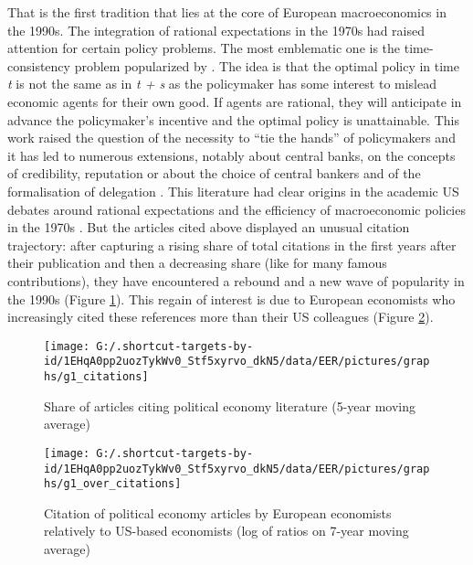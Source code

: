 \documentclass[]{elsarticle} %
\begin{document}
That is the first tradition that lies at the core of European
macroeconomics in the 1990s. The integration of rational expectations in
the 1970s had raised attention for certain policy problems. The most
emblematic one is the time-consistency problem popularized by
\citet{kydland1977}. The idea is that the optimal policy in time
\emph{t} is not the same as in \emph{t + s} as the policymaker has some
interest to mislead economic agents for their own good. If agents are
rational, they will anticipate in advance the policymaker's incentive
and the optimal policy is unattainable. This work raised the question of
the necessity to ``tie the hands'' of policymakers and it has led to
numerous extensions, notably about central banks, on the concepts of
credibility, reputation \citep{barro1983, barro1983c} or about the
choice of central bankers and of the formalisation of delegation
\citep{rogoff1985b}. This literature had clear origins in the academic
US debates around rational expectations and the efficiency of
macroeconomic policies in the 1970s \citep[80-86]{hoover1988}. But the
articles cited above displayed an unusual citation trajectory: after
capturing a rising share of total citations in the first years after
their publication and then a decreasing share (like for many famous
contributions), they have encountered a rebound and a new wave of
popularity in the 1990s (Figure \ref{fig:plot-political-economy}). This
regain of interest is due to European economists who increasingly cited
these references more than their US colleagues (Figure
\ref{fig:plot-political-economy-europe}).

\begin{figure}[h]

{\centering \texttt{[image: G:/.shortcut-targets-by-id/1EHqA0pp2uozTykWv0\_Stf5xyrvo\_dkN5/data/EER/pictures/graphs/g1\_citations]} 

}

\caption{Share of articles citing political economy literature (5-year moving average)}\label{fig:plot-political-economy}
\end{figure}

\begin{figure}[h]

{\centering \texttt{[image: G:/.shortcut-targets-by-id/1EHqA0pp2uozTykWv0\_Stf5xyrvo\_dkN5/data/EER/pictures/graphs/g1\_over\_citations]} 

}

\caption{Citation of political economy articles by European economists relatively to US-based economists (log of ratios on 7-year moving average)}\label{fig:plot-political-economy-europe}
\end{figure}
\end{document}
